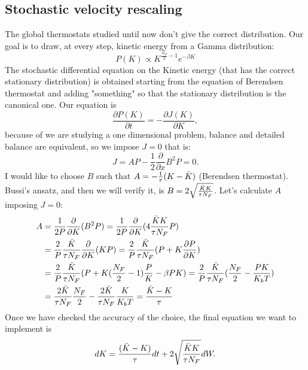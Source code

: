 \subsection{Stochastic velocity rescaling}
The global thermostats studied until now don't give the correct distribution. Our goal is to draw, at every step, kinetic energy from a Gamma distribution:
    \begin{equation*}
        P(K) \propto K^{\frac{N_F}{2} -1}e^{-\beta K}
    \end{equation*}
The stochastic differential equation on the Kinetic energy (that has the correct stationary distribution) is obtained starting from the equation of Berendsen thermostat and adding "something" so that the stationary distribution is the canonical one. 
Our equation is 
    \begin{equation}
        \frac{\partial P(K)}{\partial t} = - \frac{\partial J(K)}{\partial K},
    \end{equation}
because of we are studying a one dimensional problem, balance and detailed balance are equivalent, so we impose $J = 0$ that is:
    \begin{equation}
        J = AP - \frac{1}{2} \frac{\partial}{\partial x}B^2 P = 0.
    \end{equation}
I would like to choose $B$ such that $A = -\frac{1}{\tau}(K - \Bar{K})$ (Berendsen thermostat). Bussi's ansatz, and then we will verify it, is $B = 2\sqrt{\frac{\Bar{K}K}{\tau N_F}}$. Let's calculate $A$ imposing $J=0$:
    \begin{align*}
        A &= \frac{1}{2 P} \frac{\partial}{\partial K}(B^2 P) = \frac{1}{2 P} \frac{\partial}{\partial K}(4\frac{\Bar{K}K}{\tau N_F} P)\\
        &= \frac{2}{P}\frac{\Bar{K}}{\tau N_F} \frac{\partial}{\partial K}(K P) = \frac{2}{P}\frac{\Bar{K}}{\tau N_F}(P + K\frac{\partial P}{\partial K})\\
        &= \frac{2}{P}\frac{\Bar{K}}{\tau N_F}(P + K(\frac{N_F}{2} -1)\frac{P}{K} - \beta P K) = \frac{2}{P}\frac{\Bar{K}}{\tau N_F}(\frac{N_F}{2} - \frac{PK}{K_b T})\\
        &=\frac{2\Bar{K}}{\tau N_F}\frac{N_F}{2} - \frac{2\Bar{K}}{\tau N_F}\frac{K}{K_b T} = \frac{\Bar{K} - K}{\tau}
    \end{align*}
Once we have checked the accuracy of the choice, the final equation we want to implement is 
    \begin{equation}
    \label{stochastic velocity rescaling}
        dK=\frac{(\bar K-K)}{\tau}dt + 2\sqrt{\frac{\Bar{K}K}{\tau N_F}}dW.
    \end{equation}